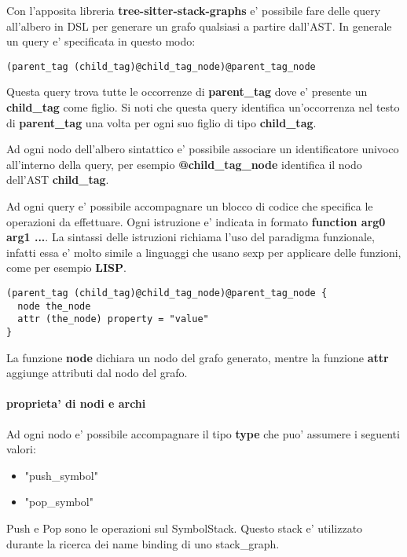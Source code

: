 Con l'apposita libreria \textbf{tree-sitter-stack-graphs} e' possibile fare delle query all'albero in DSL per generare un grafo qualsiasi a partire dall'AST.
In generale un query e' specificata in questo modo:

\begin{verbatim}
(parent_tag (child_tag)@child_tag_node)@parent_tag_node
\end{verbatim}

Questa query trova tutte le occorrenze di \textbf{parent\_tag} dove e' presente un \textbf{child\_tag} come figlio.
Si noti che questa query identifica un'occorrenza nel testo di \textbf{parent\_tag} una volta per ogni suo figlio di tipo \textbf{child\_tag}.

Ad ogni nodo dell'albero sintattico e' possibile associare un identificatore univoco all'interno della query, per esempio \textbf{@child\_tag\_node} identifica il nodo dell'AST \textbf{child\_tag}.

Ad ogni query e' possibile accompagnare un blocco di codice che specifica le operazioni da effettuare.
Ogni istruzione e' indicata in formato \textbf{function arg0 arg1 ...}.
La sintassi delle istruzioni richiama l'uso del paradigma funzionale, infatti essa e' molto simile a linguaggi che usano sexp per applicare delle funzioni, come per esempio \textbf{LISP}.

\begin{verbatim}
(parent_tag (child_tag)@child_tag_node)@parent_tag_node {
  node the_node
  attr (the_node) property = "value"
}
\end{verbatim}

La funzione \textbf{node} dichiara un nodo del grafo generato, mentre la funzione \textbf{attr} aggiunge attributi dal nodo del grafo.

\paragraph{proprieta' di nodi e archi}

Ad ogni nodo e' possibile accompagnare il tipo \textbf{type} che puo' assumere i seguenti valori:

\begin{itemize}
  \item "push\_symbol"
  \item "pop\_symbol"
\end{itemize}

Push e Pop sono le operazioni sul SymbolStack.
Questo stack e' utilizzato durante la ricerca dei name binding di uno stack\_graph.

